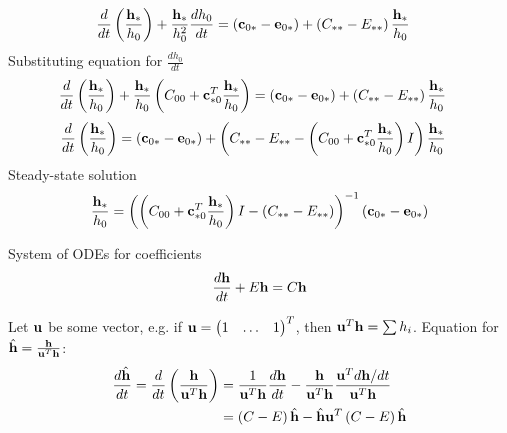 \documentclass{article}[draft]
\begin{document}
\begin{align*}
\frac{d}{dt} \left( \frac{\mathbf{h}_\ast}{h_0} \right) + \frac{\mathbf{h}_\ast}{h_0^2} \frac{dh_0}{dt} &= 
\left( \mathbf{c}_{0\ast} - \mathbf{e}_{0\ast} \right)
+ \left( C_{\ast\ast} - E_{\ast\ast} \right) \frac{\mathbf{h}_\ast}{h_0}
\end{align*}
Substituting equation for $\frac{dh_0}{dt}$
\begin{align*}
\frac{d}{dt} \left( \frac{\mathbf{h}_\ast}{h_0} \right) 
+ \frac{\mathbf{h}_\ast}{h_0} \left(C_{00} + \mathbf{c}_{\ast 0}^T \frac{\mathbf{h}_\ast}{h_0} \right) &= 
\left( \mathbf{c}_{0\ast} - \mathbf{e}_{0\ast} \right)
+ \left( C_{\ast\ast} - E_{\ast\ast} \right) \frac{\mathbf{h}_\ast}{h_0}
\end{align*}
\begin{align*}
\frac{d}{dt} \left( \frac{\mathbf{h}_\ast}{h_0} \right) 
&= 
\left( \mathbf{c}_{0\ast} - \mathbf{e}_{0\ast} \right)
+ \left( C_{\ast\ast} - E_{\ast\ast} - \left(C_{00} + \mathbf{c}_{\ast 0}^T \frac{\mathbf{h}_\ast}{h_0} \right) I \right) \frac{\mathbf{h}_\ast}{h_0}
\end{align*}
Steady-state solution
\begin{align*}
\frac{\mathbf{h}_\ast}{h_0} = 
\left( \left(C_{00} + \mathbf{c}_{\ast 0}^T \frac{\mathbf{h}_\ast}{h_0} \right) I
- \left( C_{\ast\ast} - E_{\ast\ast} \right) \right)^{-1}
\left( \mathbf{c}_{0\ast} - \mathbf{e}_{0\ast} \right)
\end{align*}


\newpage


System of ODEs for coefficients
\begin{align*}
\frac{d \mathbf{h}}{dt} + E \mathbf{h} = C \mathbf{h}
\end{align*}

Let $\mathbf{u}$ be some vector, e.g. if $\mathbf{u} = \begin{pmatrix}
1 & \ldots & 1 
\end{pmatrix}^T$, then $\mathbf{u}^T \mathbf{h} = \sum h_i$.
Equation for $\hat{\mathbf{h}} = \frac{\mathbf{h}}{\mathbf{u}^T \mathbf{h}}$:
\begin{align*}
\frac{d \hat{\mathbf{h}}}{dt} 
=
\frac{d}{dt} \left( \frac{\mathbf{h}}{\mathbf{u}^T \mathbf{h}} \right) 
&= 
\frac{1}{\mathbf{u}^T \mathbf{h}} \frac{d\mathbf{h}}{dt}
- \frac{\mathbf{h}}{\mathbf{u}^T \mathbf{h}} \frac{\mathbf{u}^T d\mathbf{h}/dt}{\mathbf{u}^T \mathbf{h}}
\\
&= \left( C - E \right) \hat{\mathbf{h}} - \hat{\mathbf{h}} \mathbf{u}^T \left( C - E \right) \hat{\mathbf{h}}
\end{align*}
\end{document}
